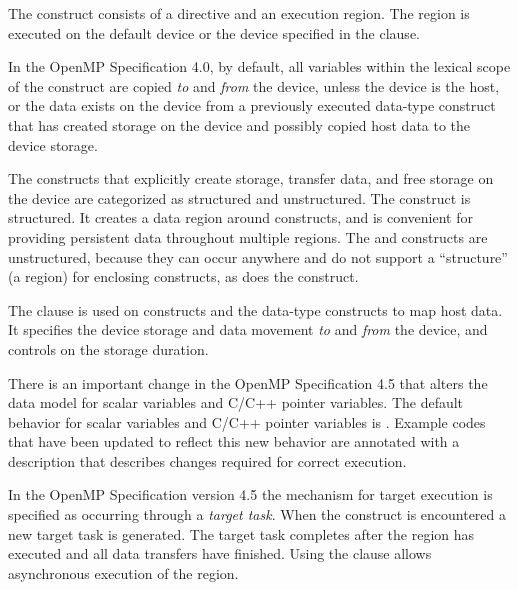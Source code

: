 \label{chap:devices}

The  construct consists of a  directive 
and an execution region. The  region is executed on
the default device or the device specified in the  
clause. 

In the OpenMP Specification 4.0, by default, all variables within the lexical
scope of the construct are copied \emph{to} and \emph{from} the
device, unless the device is the host, or the data exists on the
device from a previously executed data-type construct that
has created storage on the device and possibly copied host
data to the device storage.

The constructs that explicitly
create storage, transfer data, and free storage on the device
are categorized as structured and unstructured. The
 construct is structured. It creates
a data region around  constructs, and is
convenient for providing persistent data throughout multiple
 regions. The  and 
 constructs are unstructured, because 
they can occur anywhere and do not support a ``structure''
(a region) for enclosing  constructs, as does the
 construct. 

The  clause is used on  
constructs and the data-type constructs to map host data. It 
specifies the device storage and data movement \emph{to} and \emph{from} the
device, and controls on the storage duration.

There is an important change in the OpenMP Specification 4.5
that alters the data model for scalar variables and C/C++ pointer variables.
The default behavior for scalar variables and C/C++ pointer variables
is . Example
codes that have been updated to reflect this new behavior are
annotated with a description that describes changes required
for correct execution.

In the OpenMP Specification version 4.5 the mechanism for target
execution is specified as occurring through a \emph{target task}.
When the  construct is encountered a new 
target task is generated. The target task 
completes after the  region has executed and all data 
transfers have finished. Using the  clause allows asynchronous
execution of the  region.


